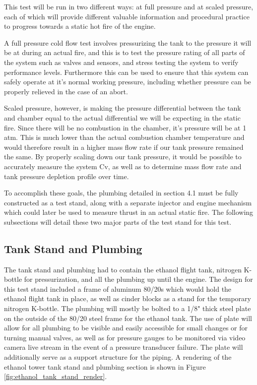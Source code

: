 \documentclass[9pt]{article} %
\numberwithin{equation}{section} %
\begin{document}
This test will be run in two different ways: at full pressure and at scaled pressure, each of which will provide different valuable information and procedural practice to progress towards a static hot fire of the engine.

A full pressure cold flow test involves pressurizing the tank to the pressure it will be at during an actual fire, and this is to test the pressure rating of all parts of the system such as valves and sensors, and stress testing the system to verify performance levels. Furthermore this can be used to ensure that this system can safely operate at it's normal working pressure, including whether pressure can be properly relieved in the case of an abort.

Scaled pressure, however, is making the pressure differential between the tank and chamber equal to the actual differential we will be expecting in the static fire. Since there will be no combustion in the chamber, it's pressure will be at 1 atm. This is much lower than the actual combustion chamber temperature and would therefore result in a higher mass flow rate if our tank pressure remained the same. By properly scaling down our tank pressure, it would be possible to accurately measure the system Cv, as well as to determine mass flow rate and tank pressure depletion profile over time.

To accomplish these goals, the plumbing detailed in section 4.1 must be fully constructed as a test stand, along with a separate injector and engine mechanism which could later be used to measure thrust in an actual static fire. The following subsections will detail these two major parts of the test stand for this test.
\subsection{Tank Stand and Plumbing}
\hspace{\parindent} The tank stand and plumbing had to contain the ethanol flight tank, nitrogen K-bottle for pressurization, and all the plumbing up until the engine. The design for this test stand included a frame of aluminum 80/20s which would hold the ethanol flight tank in place, as well as cinder blocks as a stand for the temporary nitrogen K-bottle. The plumbing will mostly be bolted to a 1/8" thick steel plate on the outside of the 80/20 steel frame for the ethanol tank. The use of plate will allow for all plumbing to be visible and easily accessible for small changes or for turning manual valves, as well as for pressure gauges to be monitored via video camera live stream in the event of a pressure transducer failure. The plate will additionally serve as a support structure for the piping. A rendering of the ethanol tower tank stand and plumbing section is shown in Figure \ref{fig:ethanol_tank_stand_render}.
\end{document}
